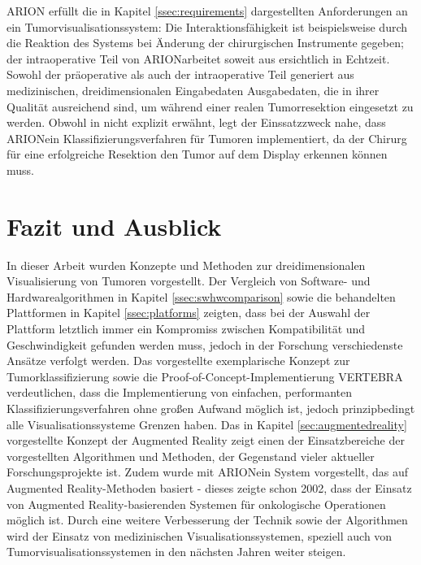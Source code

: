 \documentclass[pdftex,a4paper,titlepage,12pt]{scrartcl}
\newtheorem[L]{boxedDefinition}{Definition}
\begin{document}
ARION erfüllt die in Kapitel \ref{ssec:requirements} dargestellten Anforderungen an ein Tumorvisualisationssystem: Die Interaktionsfähigkeit ist beispielsweise durch die Reaktion des Systems bei Änderung der chirurgischen Instrumente gegeben; der intraoperative Teil von ARION\texttrademark arbeitet soweit aus \cite{Suthau2002DE} ersichtlich in Echtzeit. Sowohl der präoperative  als auch der intraoperative Teil generiert aus medizinischen, dreidimensionalen Eingabedaten Ausgabedaten, die in ihrer Qualität ausreichend sind, um während einer realen Tumorresektion eingesetzt zu werden. Obwohl in \cite{Suthau2002DE} nicht explizit erwähnt, legt der Einssatzzweck nahe, dass ARION\texttrademark ein Klassifizierungsverfahren für Tumoren implementiert, da der Chirurg für eine erfolgreiche Resektion den Tumor auf dem Display erkennen können muss.

\section{Fazit und Ausblick}\label{sec:facit}
In dieser Arbeit wurden Konzepte und Methoden zur dreidimensionalen Visualisierung von Tumoren vorgestellt.
Der Vergleich von Software- und Hardwarealgorithmen in Kapitel \ref{ssec:swhwcomparison} sowie die behandelten Plattformen in Kapitel \ref{ssec:platforms} zeigten, dass bei der Auswahl der Plattform letztlich immer ein Kompromiss zwischen Kompatibilität und Geschwindigkeit gefunden werden muss, jedoch in der Forschung verschiedenste Ansätze verfolgt werden. Das vorgestellte exemplarische Konzept zur Tumorklassifizierung sowie die Proof-of-Concept-Implementierung VERTEBRA verdeutlichen, dass die Implementierung von einfachen, performanten Klassifizierungsverfahren ohne großen Aufwand möglich ist, jedoch prinzipbedingt alle Visualisationssysteme Grenzen haben.
Das in Kapitel \ref{sec:augmentedreality} vorgestellte Konzept der Augmented Reality zeigt einen der Einsatzbereiche der vorgestellten Algorithmen und Methoden, der Gegenstand vieler aktueller Forschungsprojekte ist. Zudem wurde mit ARION\texttrademark ein System vorgestellt, das auf Augmented Reality-Methoden basiert - dieses zeigte schon 2002, dass der Einsatz von Augmented Reality-basierenden Systemen für onkologische Operationen möglich ist. Durch eine weitere Verbesserung der Technik sowie der Algorithmen wird der Einsatz von medizinischen Visualisationssystemen, speziell auch von Tumorvisualisationssystemen in den nächsten Jahren weiter steigen.

\newpage
\appendix \label{appendixstart}
\end{document}
